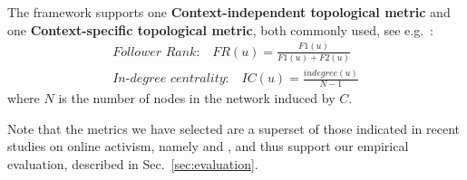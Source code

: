 The framework supports one \textbf{Context-independent topological metric} and one \textbf{Context-specific topological metric}, both commonly used, see e.g.~\cite{RIQUELME2016949}:
\begin{align}
\textit{Follower Rank:}  \quad \mathit{FR}(u) = \frac{\mathit{F1}(u)}{\mathit{F1}(u)+\mathit{F2}(u)}   \label{eq:FR}\\
\textit{In-degree centrality:} \quad \mathit{IC}(u) = \frac{\mathit{indegree}(u)}{N-1}  \label{eq:IDC}
\end{align}
where $N$ is the number of nodes in the network induced by $C$.

Note that the metrics we have selected are a superset of those indicated in recent studies on online activism, namely \cite{IJoC1246} and \cite{Poell2014}, and thus support our empirical evaluation, described in Sec.~\ref{sec:evaluation}.

